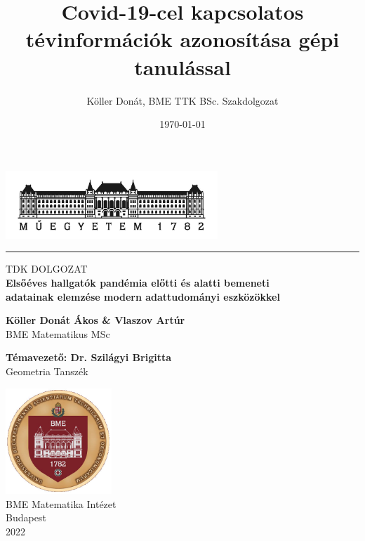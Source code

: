 \documentclass[12pt]{article}
\title{Covid-19-cel kapcsolatos tévinformációk azonosítása gépi tanulással}
\author{Köller Donát, BME TTK BSc. Szakdolgozat}
\date{\today}
\begin{document}
\begin{titlepage}
\begin{center}
       \includegraphics[width=0.6\textwidth]{kepek/bme_logo_kicsi}
       \rule{15cm}{0.1mm}
       
       \vspace*{0.5cm}
       
       
       
       \huge{TDK DOLGOZAT} \\
       
       

       \vspace{1cm}
        \Large{\textbf{Elsőéves hallgatók pandémia előtti és alatti bemeneti}} \\
        \Large{\textbf{adatainak elemzése modern adattudományi eszközökkel}} 
        
        \vspace{1.8cm}
        
        \large{\textbf{Köller Donát Ákos \& Vlaszov Artúr}}\\
       \large{BME Matematikus MSc} \\
       
       
       \vspace{1.8cm}
               

      \large{\textbf{Témavezető: Dr. Szilágyi Brigitta}}\\
      \large{Geometria Tanszék}
            
       
            
       \vfill
     
       \includegraphics[width=0.3\textwidth]{kepek/bme_cimer}\\
       \large{BME Matematika Intézet} \\
       \large{Budapest} \\
       \large{2022}
            

            
   \end{center}
\end{titlepage}
\newpage
\end{document}
